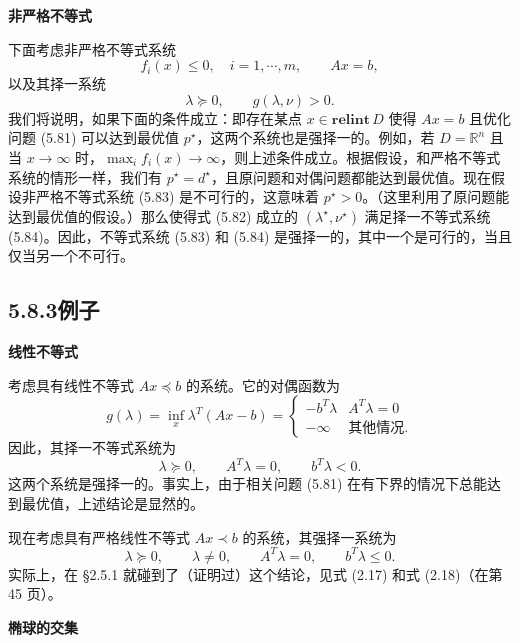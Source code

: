 \documentclass[UTF8,12pt,a4paper,fontset=fandol]{ctexart}
\begin{document}
\noindent\textbf{非严格不等式}

下面考虑非严格不等式系统
\begin{equation}
f_i(x)\leq 0,\quad i=1,\cdots,m,\qquad Ax=b,
\tag{5.83}
\end{equation}
以及其择一系统
\begin{equation}
\lambda\succeq 0,\qquad g(\lambda,\nu)>0.
\tag{5.84}
\end{equation}
我们将说明，如果下面的条件成立：即存在某点 $x\in\mathbf{relint}\,D$ 使得 $Ax=b$ 且优化问题 (5.81) 可以达到最优值 $p^\star$，这两个系统也是强择一的。例如，若 $D=\mathbb{R}^n$ 且当 $x\to\infty$ 时，$\max_i f_i(x)\to\infty$，则上述条件成立。根据假设，和严格不等式系统的情形一样，我们有 $p^\star=d^\star$，且原问题和对偶问题都能达到最优值。现在假设非严格不等式系统 (5.83) 是不可行的，这意味着 $p^\star>0$。（这里利用了原问题能达到最优值的假设。）那么使得式 (5.82) 成立的 $(\lambda^\star,\nu^\star)$ 满足择一不等式系统 (5.84)。因此，不等式系统 (5.83) 和 (5.84) 是强择一的，其中一个是可行的，当且仅当另一个不可行。

\subsection*{5.8.3\quad 例子}

\noindent\textbf{线性不等式}

考虑具有线性不等式 $Ax\preceq b$ 的系统。它的对偶函数为
\[
g(\lambda)=\inf_x \lambda^T(Ax-b)=
\begin{cases}
-b^T\lambda & A^T\lambda=0\\
-\infty & \text{其他情况}.
\end{cases}
\]
因此，其择一不等式系统为
\[
\lambda\succeq 0,\qquad A^T\lambda=0,\qquad b^T\lambda<0.
\]
这两个系统是强择一的。事实上，由于相关问题 (5.81) 在有下界的情况下总能达到最优值，上述结论是显然的。

现在考虑具有严格线性不等式 $Ax\prec b$ 的系统，其强择一系统为
\[
\lambda\succeq 0,\qquad \lambda\neq 0,\qquad A^T\lambda=0,\qquad b^T\lambda\leq 0.
\]
实际上，在 §2.5.1 就碰到了（证明过）这个结论，见式 (2.17) 和式 (2.18)（在第 45 页）。

\noindent\textbf{椭球的交集}
\end{document}

